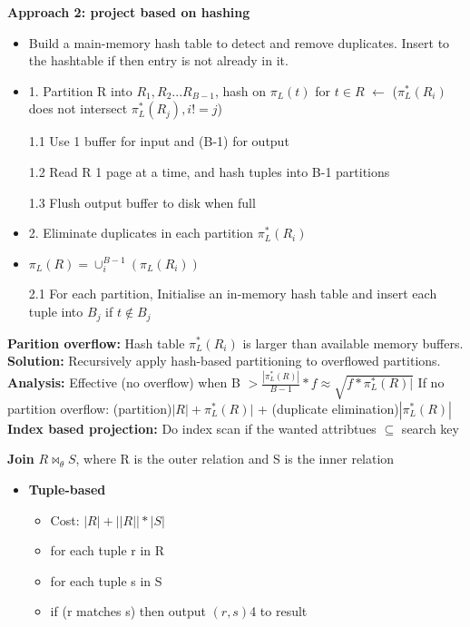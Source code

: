\documentclass[10pt, landscape]{article}
\begin{document}
\begin{multicols}{4}
\textbf{Approach 2: project based on hashing}
\begin{itemize}
  \item Build a main-memory hash table to detect and remove duplicates. Insert to the hashtable if then entry is not already in it.
  \item 1. Partition R into $R_1, R_2...R_{B-1}$, hash on $\pi_L(t)$ for $t \in R$ $\leftarrow$ ($\pi^*_L(R_i)$ does not intersect $\pi^*_L(R_j), i!=j$)
  \item[1.1] Use 1 buffer for input and (B-1) for output
  \item[1.2] Read R 1 page at a time, and hash tuples into B-1 partitions
  \item[1.3] Flush output buffer to disk when full  
  \item 2. Eliminate duplicates in each partition $\pi^*_L(R_i)$
  \item $\pi_L(R)=\cup^{B-1}_i(\pi_L(R_i))$
  \item[2.1] For each partition, Initialise an in-memory hash table and insert each tuple into $B_j$ if $t \notin B_j$
\end{itemize}
\textbf{Parition overflow:} Hash table $\pi^*_L(R_i)$ is larger than available memory buffers. \newline
\textbf{Solution:} Recursively apply hash-based partitioning to overflowed partitions. \newline
\textbf{Analysis:} Effective (no overflow) when B $ > \frac{|\pi^*_L(R)|}{B-1} * f \approx \sqrt{f * \pi^*_L(R)|}$ \newline
If no partition overflow: (partition)$|R|+\pi^*_L(R)|$ + (duplicate elimination)$|\pi^*_L(R)|$ \newline
\textbf{Index based projection:} Do index scan if the wanted attribtues $\subseteq$ search key\newline

\textbf{Join} $R \Join_\theta S$, where R is the outer relation and S is the inner relation

\begin{multicols}{2}

    \begin{itemize}
      \item \textbf{Tuple-based} \newline
      \begin{itemize}
        \item Cost: $|R| + ||R||*|S|$
        \item for each tuple r in R 
        \item for each tuple s in S 
        \item if (r matches s) then output $(r,s)$4 to result
      \end{itemize}


\end{itemize}
\end{multicols}
\end{multicols}
\end{document}
